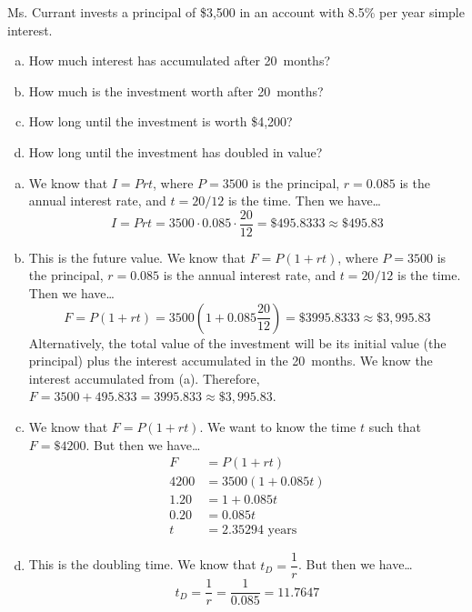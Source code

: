\documentclass[11pt,letterpaper]{article}
\begin{document}

 Ms. Currant invests a principal of \$3,500 in an account with 8.5\% per year simple interest.
	\begin{enumerate}[(a)]
	\item How much interest has accumulated after 20~months?
	\item How much is the investment worth after 20~months?
	\item How long until the investment is worth \$4,200?
	\item How long until the investment has doubled in value?
	\end{enumerate} \pspace

\sol
\begin{enumerate}[(a)]
\item We know that $I= Prt$, where $P= 3500$ is the principal, $r= 0.085$ is the annual interest rate, and $t= 20/12$ is the time. Then we have\dots
	\[
	I= Prt= 3500 \cdot 0.085 \cdot \dfrac{20}{12}= \$495.8333 \approx \$495.83
	\] \pspace

\item This is the future value. We know that $F= P(1 + rt)$, where $P= 3500$ is the principal, $r= 0.085$ is the annual interest rate, and $t= 20/12$ is the time. Then we have\dots
	\[
	F= P(1 + rt)= 3500 \left(1 + 0.085 \dfrac{20}{12} \right)= \$3995.8333 \approx \$3,995.83
	\]
Alternatively, the total value of the investment will be its initial value (the principal) plus the interest accumulated in the 20~months. We know the interest accumulated from (a). Therefore, $F= 3500 + 495.833= 3995.833 \approx \$3,995.83$. \pspace

\item We know that $F= P(1 + rt)$. We want to know the time $t$ such that $F= \$4200$. But then we have\dots
	\[
	\begin{aligned}
	F&= P(1 + rt) \\
	4200&= 3500(1 + 0.085t) \\
	1.20&= 1 + 0.085t \\
	0.20&= 0.085t \\
	t&= 2.35294 \text{ years}
	\end{aligned}
	\] \pspace

\item This is the doubling time. We know that $t_D= \dfrac{1}{r}$. But then we have\dots
	\[
	t_D= \dfrac{1}{r}= \dfrac{1}{0.085}= 11.7647
	\]
\end{enumerate}
\end{document}
